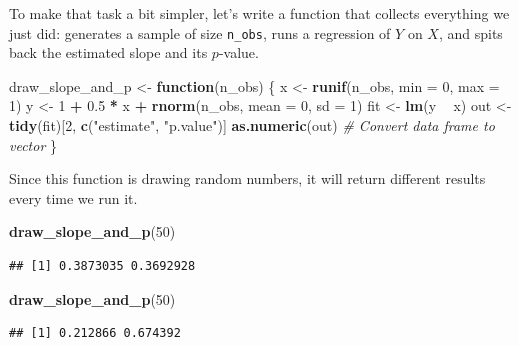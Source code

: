 \documentclass[12pt,oneside,openany]{book}
\newenvironment{Shaded}{\begin{snugshade}}{\end{snugshade}}
\newcommand{\KeywordTok}[1]{\textcolor[rgb]{0.13,0.29,0.53}{\textbf{#1}}}
\newcommand{\DataTypeTok}[1]{\textcolor[rgb]{0.13,0.29,0.53}{#1}}
\newcommand{\DecValTok}[1]{\textcolor[rgb]{0.00,0.00,0.81}{#1}}
\newcommand{\FloatTok}[1]{\textcolor[rgb]{0.00,0.00,0.81}{#1}}
\newcommand{\StringTok}[1]{\textcolor[rgb]{0.31,0.60,0.02}{#1}}
\newcommand{\CommentTok}[1]{\textcolor[rgb]{0.56,0.35,0.01}{\textit{#1}}}
\newcommand{\ControlFlowTok}[1]{\textcolor[rgb]{0.13,0.29,0.53}{\textbf{#1}}}
\newcommand{\OperatorTok}[1]{\textcolor[rgb]{0.81,0.36,0.00}{\textbf{#1}}}
\newcommand{\NormalTok}[1]{#1}
\begin{document}
To make that task a bit simpler, let's write a function that collects
everything we just did: generates a sample of size \texttt{n\_obs}, runs
a regression of \(Y\) on \(X\), and spits back the estimated slope and
its \(p\)-value.

\begin{Shaded}
\begin{Highlighting}[]
\NormalTok{draw_slope_and_p <-}\StringTok{ }\ControlFlowTok{function}\NormalTok{(n_obs) \{}
\NormalTok{    x <-}\StringTok{ }\KeywordTok{runif}\NormalTok{(n_obs, }\DataTypeTok{min =} \DecValTok{0}\NormalTok{, }\DataTypeTok{max =} \DecValTok{1}\NormalTok{)}
\NormalTok{    y <-}\StringTok{ }\DecValTok{1} \OperatorTok{+}\StringTok{ }\FloatTok{0.5} \OperatorTok{*}\StringTok{ }\NormalTok{x }\OperatorTok{+}\StringTok{ }\KeywordTok{rnorm}\NormalTok{(n_obs, }\DataTypeTok{mean =} \DecValTok{0}\NormalTok{, }\DataTypeTok{sd =} \DecValTok{1}\NormalTok{)}
\NormalTok{    fit <-}\StringTok{ }\KeywordTok{lm}\NormalTok{(y }\OperatorTok{~}\StringTok{ }\NormalTok{x)}
\NormalTok{    out <-}\StringTok{ }\KeywordTok{tidy}\NormalTok{(fit)[}\DecValTok{2}\NormalTok{, }\KeywordTok{c}\NormalTok{(}\StringTok{"estimate"}\NormalTok{, }\StringTok{"p.value"}\NormalTok{)]}
    \KeywordTok{as.numeric}\NormalTok{(out)  }\CommentTok{# Convert data frame to vector}
\NormalTok{\}}
\end{Highlighting}
\end{Shaded}

Since this function is drawing random numbers, it will return different
results every time we run it.

\begin{Shaded}
\begin{Highlighting}[]
\KeywordTok{draw_slope_and_p}\NormalTok{(}\DecValTok{50}\NormalTok{)}
\end{Highlighting}
\end{Shaded}

\begin{verbatim}
## [1] 0.3873035 0.3692928
\end{verbatim}

\begin{Shaded}
\begin{Highlighting}[]
\KeywordTok{draw_slope_and_p}\NormalTok{(}\DecValTok{50}\NormalTok{)}
\end{Highlighting}
\end{Shaded}

\begin{verbatim}
## [1] 0.212866 0.674392
\end{verbatim}
\end{document}
